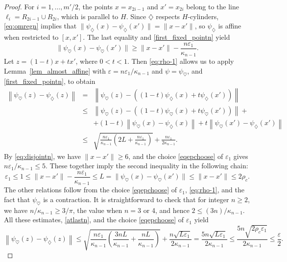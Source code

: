 \documentclass[12pt,reqno]{amsart}
\newcommand{\ee}{\varepsilon}
\newcommand{\di}{\diamondsuit}
\numberwithin{equation}{section}
\begin{document}
\begin{proof}
For $i=1,\dots,m'/2$, the points $x=x_{2i-1}$ and $x'=x_{2i}$ belong to the line $\ell_i=R_{2i-1}\cup R_{2i}$, which is parallel to $H$. Since $\di$ respects $H$-cylinders, \eqref{eq:omregn} implies that $\|\psi_\di(x)-\psi_\di(x')\|=\|x-x'\|$, so $\psi_\di$ is affine when restricted to $[x,x']$.  The last equality and \eqref{first_fixed_pointn} yield
\begin{equation}\label{eq:rho-1}
\|\psi_{\heartsuit}(x)-\psi_{\heartsuit}(x')\|\ge \|x-x'\|-\frac{n\ee_1}{\kappa_{n-1}}.
\end{equation}
Let $z=(1-t)x+tx'$, where $0<t<1$.  Then \eqref{eq:rho-1} allows us to apply Lemma~\ref{lem_almost_affine} with $\ee=n\ee_1/\kappa_{n-1}$ and $\psi=\psi_{\heartsuit}$, and \eqref{first_fixed_pointn}, to obtain
\begin{eqnarray}
\left\|	\psi_{\heartsuit}(z)-\psi_{\di}(z)\right\|
&=& \left\|	\psi_{\heartsuit}(z)-((1-t)\psi_{\di}(x)+t\psi_{\di}(x'))\right\|\nonumber\\
&\le& \left\|\psi_{\heartsuit}(z)-((1-t)\psi_{\heartsuit}(x)
+t\psi_{\heartsuit}(x'))\right\|+\nonumber\\
& &+(1-t)\left\|\psi_{\heartsuit}(x)-\psi_{\di}(x)\right\|+
t\left\|\psi_{\heartsuit}(x')-\psi_{\di}(x')\right\|\nonumber\\
&\le &\sqrt{\frac{n\ee_1}{\kappa_{n-1}}\left(2L+\frac{n\ee_1}{\kappa_{n-1}}
\right)}+\frac{n\ee_1}{2\kappa_{n-1}}.
\label{atlastn}
\end{eqnarray}
By \eqref{eq:disjointn}, we have $\|x-x'\|\ge 6$, and the choice \eqref{eqepchoose} of $\ee_1$ gives $n\ee_1/\kappa_{n-1}\le 5$.  These together imply the second inequality in the following chain:
\[
\ee_1\le 1\le \|x-x'\|-\frac{n\ee_1}{\kappa_{n-1}}\le L=\|\psi_{\heartsuit}(x)-\psi_{\heartsuit}(x')\|\le \|x-x'\|\le 2\rho_c.
\]
The other relations follow from the choice \eqref{eqepchoose} of $\ee_1$, \eqref{eq:rho-1}, and the fact that $\psi_\heartsuit$ is a contraction.  It is straightforward to check that for integer $n\ge 2$, we have $n/\kappa_{n-1}\ge 3/\pi$, the value when $n=3$ or 4, and hence $2\le (3n)/\kappa_{n-1}$.  All these estimates,  \eqref{atlastn}, and the choice \eqref{eqepchoose} of $\ee_1$ yield
\begin{equation}\label{eq6425}\left\|	\psi_{\heartsuit}(z)-\psi_{\di}(z)\right\|\le\sqrt{\frac{n\ee_1}{\kappa_{n-1}}\left(\frac{3nL}{\kappa_{n-1}}
+\frac{nL}{\kappa_{n-1}}\right)}+\frac{n\sqrt{L\ee_1}}{2\kappa_{n-1}}
= \frac{5n\sqrt{L\ee_1}}{2\kappa_{n-1}}\le \frac{5n\sqrt{2\rho_c\ee_1}}{2\kappa_{n-1}}\le\frac{\ee}{2}.
\end{equation}


\end{proof}
\end{document}
